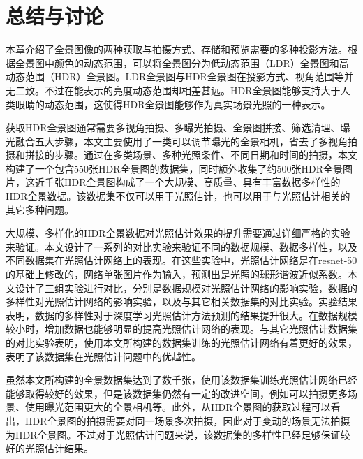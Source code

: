 \section{总结与讨论}
本章介绍了全景图像的两种获取与拍摄方式、存储和预览需要的多种投影方法。根据全景图中颜色的动态范围，可以将全景图分为低动态范围（LDR）全景图和高动态范围（HDR）全景图。LDR全景图与HDR全景图在投影方式、视角范围等并无二致。不过在能表示的亮度动态范围却相差甚远。HDR全景图能够支持大于人类眼睛的动态范围，这使得HDR全景图能够作为真实场景光照的一种表示。

获取HDR全景图通常需要多视角拍摄、多曝光拍摄、全景图拼接、筛选清理、曝光融合五大步骤，本文主要使用了一类可以调节曝光的全景相机，省去了多视角拍摄和拼接的步骤。通过在多类场景、多种光照条件、不同日期和时间的拍摄，本文构建了一个包含550张HDR全景图的数据集，同时额外收集了约500张HDR全景图片，这近千张HDR全景图构成了一个大规模、高质量、具有丰富数据多样性的HDR全景数据。该数据集不仅可以用于光照估计，也可以用于与光照估计相关的其它多种问题。

大规模、多样化的HDR全景数据对光照估计效果的提升需要通过详细严格的实验来验证。本文设计了一系列的对比实验来验证不同的数据规模、数据多样性，以及不同数据集在光照估计网络上的表现。在这些实验中，光照估计网络是在resnet-50的基础上修改的，网络单张图片作为输入，预测出是光照的球形谐波近似系数。本文设计了三组实验进行对比，分别是数据规模对光照估计网络的影响实验，数据的多样性对光照估计网络的影响实验，以及与其它相关数据集的对比实验。实验结果表明，数据的多样性对于深度学习光照估计方法预测的结果提升很大。在数据规模较小时，增加数据也能够明显的提高光照估计网络的表现。与其它光照估计数据集的对比实验表明，使用本文所构建的数据集训练的光照估计网络有着更好的效果，表明了该数据集在光照估计问题中的优越性。

虽然本文所构建的全景数据集达到了数千张，使用该数据集训练光照估计网络已经能够取得较好的效果，但是该数据集仍然有一定的改进空间，例如可以拍摄更多场景、使用曝光范围更大的全景相机等。此外，从HDR全景图的获取过程可以看出，HDR全景图的拍摄需要对同一场景多次拍摄，因此对于变动的场景无法拍摄为HDR全景图。不过对于光照估计问题来说，该数据集的多样性已经足够保证较好的光照估计结果。